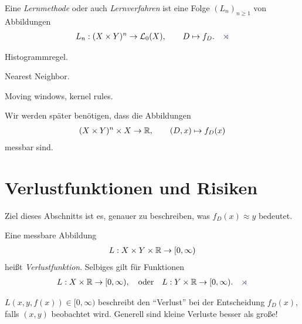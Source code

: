 \begin{defn}
\label{defn:1.1.1}
Eine \emph{Lernmethode} oder auch \emph{Lernverfahren} ist eine Folge
$(L_n)_{n\ge 1}$ von Abbildungen
\begin{align*}
L_n : (X\times Y)^n\to \LL_0(X),\qquad D\mapsto f_D.\fishhere
\end{align*}
\end{defn}

\begin{bsp*}
\begin{bspenum}
\item Histogrammregel.
\item Nearest Neighbor.
\item Moving windows, kernel rules.\bsphere
\end{bspenum}
\end{bsp*}

\begin{bem}
Wir werden später benötigen, dass die Abbildungen
\begin{align*}
(X\times Y)^n\times X \to \mathbb{R},\qquad (D,x) \mapsto f_D(x)
\end{align*}
messbar sind.\maphere
\end{bem}

\section{Verlustfunktionen und Risiken}
\label{sec:1.2}

Ziel dieses Abschnitts ist es, genauer zu beschreiben, was $f_D(x) \approx y$
bedeutet.

\begin{defn}
\label{defn:1.2.1}
Eine messbare Abbildung
\begin{align*}
L: X\times Y\times\mathbb{R}\to [0,\infty)
\end{align*}
heißt \emph{Verlustfunktion}. Selbiges gilt für
Funktionen
\begin{align*}
L: X\times \R\to [0,\infty),\quad \text{oder}\quad L:Y\times \R\to
[0,\infty).\fishhere
\end{align*}
\end{defn}

\begin{bem*}[Interpretation.]
$L(x,y,f(x))\in [0,\infty)$ beschreibt den ``Verlust'' bei der Entscheidung
$f_D(x)$, falls $(x,y)$ beobachtet wird. Generell sind kleine Verluste besser
als große!\maphere
\end{bem*}

